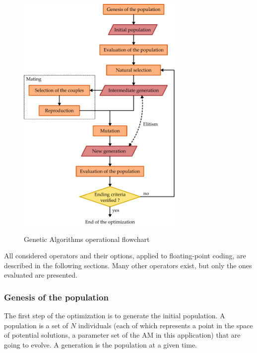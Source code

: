 \documentclass[twocol]{ametsoc}
\begin{document}
\begin{figure}[htb]
	\noindent\includegraphics[width=19pc,angle=0]{figures/figure_structure_gas.pdf}\\
	\caption{Genetic Algorithms operational flowchart}
	\label{fig:structure_gas}
\end{figure}

All considered operators and their options, applied to floating-point coding, are described in the following sections. Many other operators exist, but only the ones evaluated are presented.

\subsubsection{Genesis of the population}

The first step of the optimization is to generate the initial population. A population is a set of $N$ individuals (each of which represents a point in the space of potential solutions, a parameter set of the AM in this application) that are going to evolve. A generation is the population at a given time. 
\end{document}
